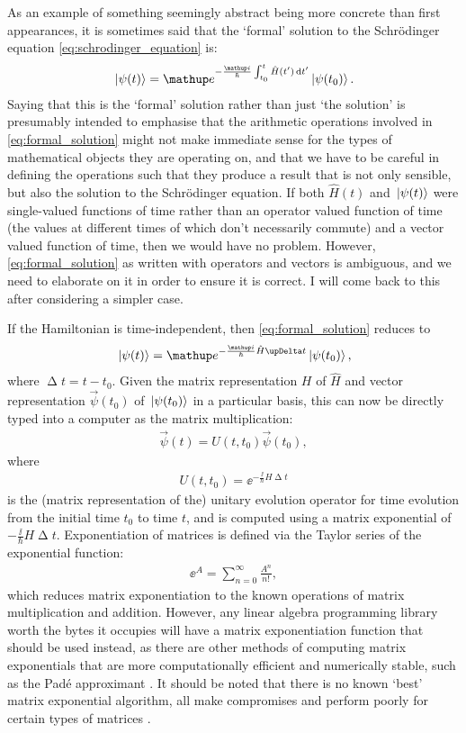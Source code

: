 As an example of something seemingly abstract being more concrete than first appearances, it is sometimes said that the `formal' solution to the Schr\"odinger equation \eqref{eq:schrodinger_equation} is:
\begin{align}\label{eq:formal_solution}
\ket{\psi(t)} = \ee^{-\frac \ii \hbar \int_{t_0}^t \hat H(t^\prime)\,\dd t^\prime}\ket{\psi(t_0)}.
\end{align}
Saying that this is the `formal' solution rather than just `the solution' is presumably intended to emphasise that the arithmetic operations involved in \eqref{eq:formal_solution} might not make immediate sense for the types of mathematical objects they are operating on, and that we have to be careful in defining the operations such that they produce a result that is not only sensible, but also the solution to the Schr\"odinger equation. If both $\hat H(t)$ and $\ket{\psi(t)}$ were single-valued functions of time rather than an operator valued function of time (the values at different times of which don't necessarily commute) and a vector valued function of time, then we would have no problem. However, \eqref{eq:formal_solution} as written with operators and vectors is ambiguous, and we need to elaborate on it in order to ensure it is correct. I will come back to this after considering a simpler case.

If the Hamiltonian is time-independent, then \eqref{eq:formal_solution} reduces to
\begin{align}
\ket{\psi(t)} = \ee^{-\frac \ii \hbar\hat H\upDelta t}\ket{\psi(t_0)},
\end{align}
where $\upDelta t = t - t_0$.
Given the matrix representation $H$ of $\hat H$ and vector representation $\vec \psi(t_0)$ of $\ket{\psi(t_0)}$ in a particular basis, this can now be directly typed into a computer as the matrix multiplication:
\begin{align}\label{eq:unitary_time_independent}
\vec \psi(t) = U(t, t_0)\vec \psi(t_0),
\end{align}
where
\begin{align}
U(t, t_0) = \ee^{-\frac \ii \hbar H \upDelta t}
\end{align}
is the (matrix representation of the) unitary evolution operator for time evolution from the initial time $t_0$ to time $t$, and is computed using a matrix exponential of $-\frac \ii \hbar H \upDelta t$. Exponentiation of matrices is defined via the Taylor series of the exponential function:
\begin{align}
\ee^A = \sum_{n=0}^\infty \frac{A^n}{n!},
\end{align}
which reduces matrix exponentiation to the known operations of matrix multiplication and addition. However, any linear algebra programming library worth the bytes it occupies will have a matrix exponentiation function that should be used instead, as there are other methods of computing matrix exponentials that are more computationally efficient and numerically stable, such as the Pad\'e approximant \cite{brezinski_extrapolation_1996}. It should be noted that there is no known `best' matrix exponential algorithm, all make compromises and perform poorly for certain types of matrices \cite{moler_nineteen_2003}.

